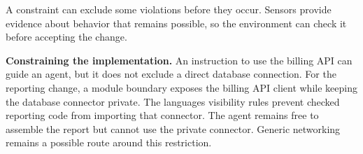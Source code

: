 



A constraint can exclude some violations before they occur. Sensors provide evidence about behavior that remains possible, so the environment can check it before accepting the change.





\textbf{Constraining the implementation.} An instruction to use the billing API can guide an agent, but it does not exclude a direct database connection. For the reporting change, a module boundary exposes the billing API client while keeping the database connector private. The language\textquotesingle s visibility rules prevent checked reporting code from importing that connector. The agent remains free to assemble the report but cannot use the private connector. Generic networking remains a possible route around this restriction.

